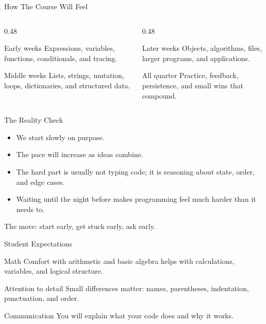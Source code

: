 \documentclass[aspectratio=169]{beamer}
\begin{document}
\begin{frame}{How The Course Will Feel}
  \begin{columns}[T,onlytextwidth]
    \begin{column}{0.48\textwidth}
      \begin{block}{Early weeks}
        Expressions, variables, functions, conditionals, and tracing.
      \end{block}
      \begin{block}{Middle weeks}
        Lists, strings, mutation, loops, dictionaries, and structured data.
      \end{block}
    \end{column}
    \begin{column}{0.48\textwidth}
      \begin{block}{Later weeks}
        Objects, algorithms, files, larger programs, and applications.
      \end{block}
      \begin{block}{All quarter}
        Practice, feedback, persistence, and small wins that compound.
      \end{block}
    \end{column}
  \end{columns}
\end{frame}

\begin{frame}{The Reality Check}
  \begin{itemize}
    \item We start slowly on purpose.
    \item The pace will increase as ideas combine.
    \item The hard part is usually not typing code; it is reasoning about state, order, and edge cases.
    \item Waiting until the night before makes programming feel much harder than it needs to.
  \end{itemize}
  \vspace{0.12in}
  \begin{activity}
    The move: start early, get stuck early, ask early.
  \end{activity}
\end{frame}

\begin{frame}{Student Expectations}
  \begin{block}{Math}
    Comfort with arithmetic and basic algebra helps with calculations, variables, and logical structure.
  \end{block}
  \begin{block}{Attention to detail}
    Small differences matter: names, parentheses, indentation, punctuation, and order.
  \end{block}
  \begin{block}{Communication}
    You will explain what your code does and why it works.
  \end{block}
\end{frame}
\end{document}
